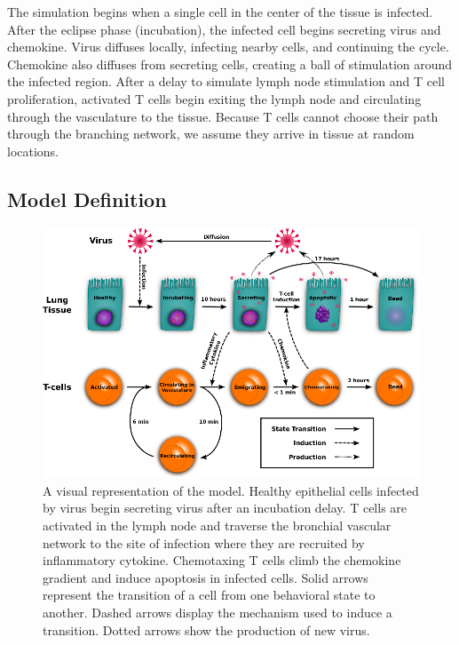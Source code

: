 \documentclass[10pt]{article}
\begin{document}
The simulation begins when a single cell in the center of the tissue is infected. After the eclipse phase (incubation), the infected cell begins secreting virus and chemokine. Virus diffuses locally, infecting nearby cells, and continuing the cycle. Chemokine also diffuses from secreting cells, creating a ball of stimulation around the infected region. After a delay to simulate lymph node stimulation and T cell proliferation, activated T cells begin exiting the lymph node and circulating through the vasculature to the tissue. Because T  cells cannot choose their path through the branching network, we assume they arrive in tissue at random locations. 


\subsection*{Model Definition}

\begin{figure}[ht!]
\begin{center}
\includegraphics[width=\textwidth]{ModelChart}
\end{center}
\caption{A visual representation of the model.  Healthy epithelial cells infected by virus begin secreting virus after an incubation delay.  T cells are activated in the lymph node and traverse the bronchial vascular network to the site of infection where they are recruited by inflammatory cytokine.  Chemotaxing T cells climb the chemokine gradient and induce apoptosis in infected cells.  Solid arrows represent the transition of a cell from one behavioral state to another.  Dashed arrows display the mechanism used to induce a transition.  Dotted arrows show the production of new virus.}
\label{fig:modelchart}
\end{figure}
\end{document}
